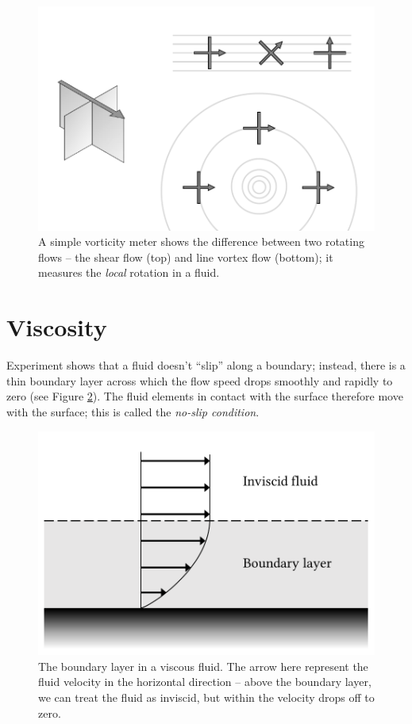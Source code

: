 \begin{figure}
\centering
\includegraphics[width=0.7\linewidth]{Figures/Chapter1/fig_vorticity1.pdf}
\caption{A simple vorticity meter shows the difference between two rotating flows -- the shear flow (top) and line vortex flow (bottom); it measures the \emph{local} rotation in a fluid.}
\label{fig_vorticity1}
\end{figure}

%
%
%

\section{Viscosity}
\label{sec_viscosity}

Experiment shows that a fluid doesn't ``slip'' along a boundary; instead, there is a thin boundary layer across which the flow speed drops smoothly and rapidly to zero (see Figure \ref{fig_boundary}).  The fluid elements in contact with the surface therefore move with the surface; this is called the \emph{no-slip condition}.

\begin{figure}
\centering\includegraphics[width=0.7\linewidth]{Figures/Chapter1/fig_boundary_layer}
\caption{The boundary layer in a viscous fluid.  The arrow here represent the fluid velocity in the horizontal direction -- above the boundary layer, we can treat the fluid as inviscid, but within the velocity drops off to zero.}
\label{fig_boundary}
\end{figure}

